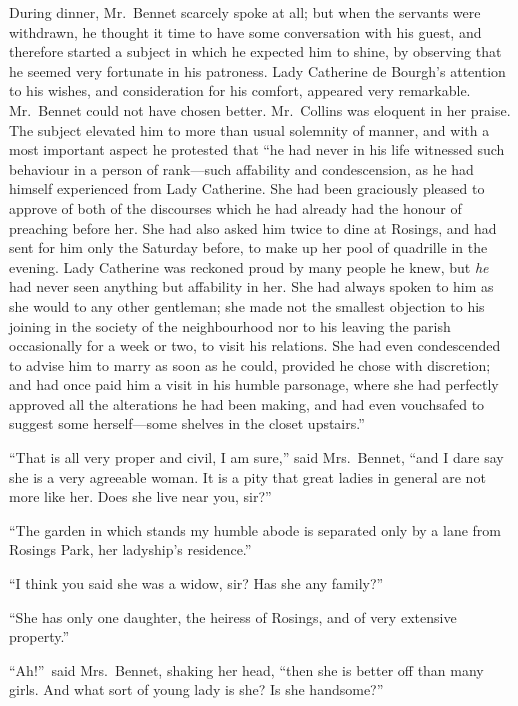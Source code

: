 \documentclass[12pt,english]{book}
\begin{document}
During dinner, Mr.\ Bennet scarcely spoke at all; but when the servants
were withdrawn, he thought it time to have some conversation with
his guest, and therefore started a subject in which he expected him
to shine, by observing that he seemed very fortunate in his patroness.
Lady Catherine de Bourgh's attention to his wishes, and consideration
for his comfort, appeared very remarkable. Mr.\ Bennet could not
have chosen better. Mr.\ Collins was eloquent in her praise. The
subject elevated him to more than usual solemnity of manner, and with
a most important aspect he protested that {}``he had never in his
life witnessed such behaviour in a person of rank\mbox{---}such affability
and condescension, as he had himself experienced from Lady Catherine.
She had been graciously pleased to approve of both of the discourses
which he had already had the honour of preaching before her. She had
also asked him twice to dine at Rosings, and had sent for him only
the Saturday before, to make up her pool of quadrille in the evening.
Lady Catherine was reckoned proud by many people he knew, but \textit{he}
had never seen anything but affability in her. She had always spoken
to him as she would to any other gentleman; she made not the smallest
objection to his joining in the society of the neighbourhood nor to
his leaving the parish occasionally for a week or two, to visit his
relations. She had even condescended to advise him to marry as soon
as he could, provided he chose with discretion; and had once paid
him a visit in his humble parsonage, where she had perfectly approved
all the alterations he had been making, and had even vouchsafed to
suggest some herself\mbox{---}some shelves in the closet upstairs.''

{}``That is all very proper and civil, I am sure,'' said Mrs.\ Bennet,
{}``and I dare say she is a very agreeable woman. It is a pity that
great ladies in general are not more like her. Does she live near
you, sir?''\ 

{}``The garden in which stands my humble abode is separated only
by a lane from Rosings Park, her ladyship's residence.''

{}``I think you said she was a widow, sir? Has she any family?''\ 

{}``She has only one daughter, the heiress of Rosings, and of very
extensive property.''

{}``Ah!''\ said Mrs.\ Bennet, shaking her head, {}``then she
is better off than many girls. And what sort of young lady is she?
Is she handsome?''\ 
\end{document}
